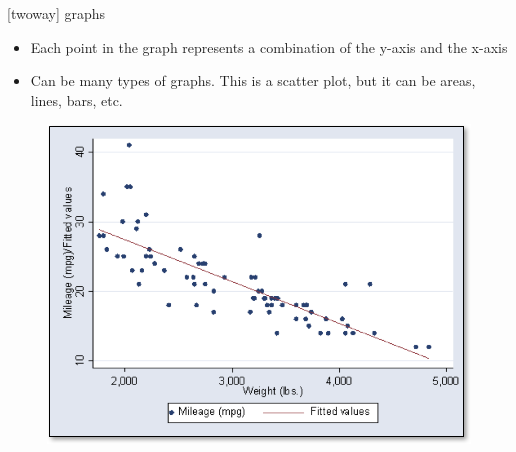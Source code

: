 \documentclass[aspectratio=169]{beamer}
\begin{document}
\begin{frame}[fragile]{ [twoway] graphs}
\begin{multicols}{2}	
	\begin{itemize}
		\item Each point in the graph represents a combination of the y-axis and the x-axis
		\item Can be many types of graphs. This is a scatter plot, but it can be areas, lines, bars, etc.
	\end{itemize}
	\begin{figure}
		\centering
		\includegraphics[width=\linewidth]{img/twoway1}
	\end{figure}
\end{multicols}
\end{frame}
\end{document}

